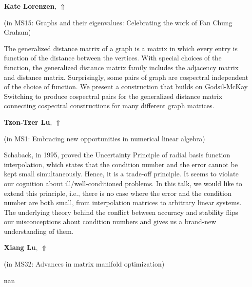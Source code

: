 \documentclass[ILAS2025-program.tex]{subfiles}
\begin{document}
\hypertarget{down0028}{}\begin{ilasabstract}
    
\textbf{Kate Lorenzen},  \hfill \hyperlink{up0028}{$\Uparrow$}
    
    
(in {\color{mstitle}MS15: Graphs and their eigenvalues: Celebrating the work of Fan Chung Graham})
        
\mtskip
    The generalized distance matrix of a graph is a matrix in which every entry is function of the distance between the vertices. With special choices of the function, the generalized distance matrix family includes the adjacency matrix and distance matrix. Surprisingly, some pairs of graph are cospectral independent of the choice of function.  We present a construction that builds on Godsil-McKay Switching to produce cospectral pairs for the generalized distance matrix connecting cospectral constructions for many different graph matrices.

\end{ilasabstract}
    

\hypertarget{down0070}{}\begin{ilasabstract}
    
\textbf{Tzon-Tzer Lu},  \hfill \hyperlink{up0070}{$\Uparrow$}
    
    
(in {\color{mstitle}MS1: Embracing new opportunities in numerical linear algebra})
        
\mtskip
    Schaback, in 1995, proved the Uncertainty Principle of radial basis function interpolation, which states that the condition number and the error cannot be kept small simultaneously. Hence, it is a trade-off principle. It seems to violate our cognition about ill/well-conditioned problems. In this talk, we would like to extend this principle, i.e., there is no case where the error and the condition number are both small, from interpolation matrices to arbitrary linear systems. The underlying theory behind the conflict between accuracy and stability flips our misconceptions about condition numbers and gives us a brand-new understanding of them. 
\end{ilasabstract}
    

\hypertarget{down0187}{}\begin{ilasabstract}
    
\textbf{Xiang Lu},  \hfill \hyperlink{up0187}{$\Uparrow$}
    
    
(in {\color{mstitle}MS32: Advances in matrix manifold optimization})
        
\mtskip
    nan
\end{ilasabstract}
    
\end{document}
